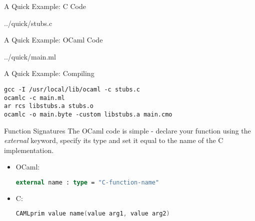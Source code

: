 \documentclass{beamer}
\begin{document}
\begin{frame}[fragile]{A Quick Example: C Code}
\begin{lstinputlisting}[language=C]{../quick/stubs.c}
\end{lstinputlisting}
\end{frame}

\begin{frame}[fragile]{A Quick Example: OCaml Code}
\begin{lstinputlisting}[language=ML]{../quick/main.ml}
\end{lstinputlisting}
\end{frame}

\begin{frame}[fragile]{A Quick Example: Compiling}
\begin{lstlisting}
gcc -I /usr/local/lib/ocaml -c stubs.c
ocamlc -c main.ml
ar rcs libstubs.a stubs.o
ocamlc -o main.byte -custom libstubs.a main.cmo
\end{lstlisting}
\end{frame}

\begin{frame}[fragile]{Function Signatures}
The OCaml code is simple - declare your function using the \emph{external} keyword,
 specify its type and set it equal to the name of the C implementation.
\begin{itemize}
    \item OCaml:
    \begin{lstlisting}[language=ML]
    external name : type = "C-function-name"
    \end{lstlisting}
    \item C:
    \begin{lstlisting}[language=C]
    CAMLprim value name(value arg1, value arg2)
    \end{lstlisting}
\end{itemize}
\end{frame}
\end{document}
